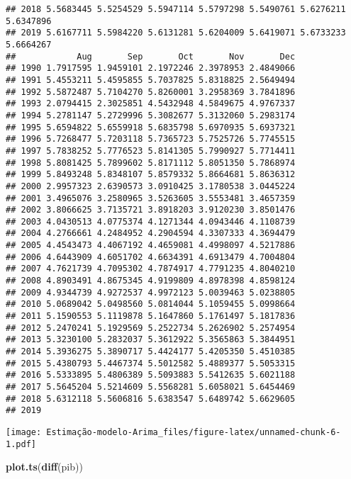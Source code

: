 \documentclass[]{article}
\newenvironment{Shaded}{\begin{snugshade}}{\end{snugshade}}
\newcommand{\CommentTok}[1]{\textcolor[rgb]{0.56,0.35,0.01}{\textit{#1}}}
\newcommand{\KeywordTok}[1]{\textcolor[rgb]{0.13,0.29,0.53}{\textbf{#1}}}
\newcommand{\NormalTok}[1]{#1}
\begin{document}
\begin{verbatim}
## 2018 5.5683445 5.5254529 5.5947114 5.5797298 5.5490761 5.6276211 5.6347896
## 2019 5.6167711 5.5984220 5.6131281 5.6204009 5.6419071 5.6733233 5.6664267
##            Aug       Sep       Oct       Nov       Dec
## 1990 1.7917595 1.9459101 2.1972246 2.3978953 2.4849066
## 1991 5.4553211 5.4595855 5.7037825 5.8318825 2.5649494
## 1992 5.5872487 5.7104270 5.8260001 3.2958369 3.7841896
## 1993 2.0794415 2.3025851 4.5432948 4.5849675 4.9767337
## 1994 5.2781147 5.2729996 5.3082677 5.3132060 5.2983174
## 1995 5.6594822 5.6559918 5.6835798 5.6970935 5.6937321
## 1996 5.7268477 5.7203118 5.7365723 5.7525726 5.7745515
## 1997 5.7838252 5.7776523 5.8141305 5.7990927 5.7714411
## 1998 5.8081425 5.7899602 5.8171112 5.8051350 5.7868974
## 1999 5.8493248 5.8348107 5.8579332 5.8664681 5.8636312
## 2000 2.9957323 2.6390573 3.0910425 3.1780538 3.0445224
## 2001 3.4965076 3.2580965 3.5263605 3.5553481 3.4657359
## 2002 3.8066625 3.7135721 3.8918203 3.9120230 3.8501476
## 2003 4.0430513 4.0775374 4.1271344 4.0943446 4.1108739
## 2004 4.2766661 4.2484952 4.2904594 4.3307333 4.3694479
## 2005 4.4543473 4.4067192 4.4659081 4.4998097 4.5217886
## 2006 4.6443909 4.6051702 4.6634391 4.6913479 4.7004804
## 2007 4.7621739 4.7095302 4.7874917 4.7791235 4.8040210
## 2008 4.8903491 4.8675345 4.9199809 4.8978398 4.8598124
## 2009 4.9344739 4.9272537 4.9972123 5.0039463 5.0238805
## 2010 5.0689042 5.0498560 5.0814044 5.1059455 5.0998664
## 2011 5.1590553 5.1119878 5.1647860 5.1761497 5.1817836
## 2012 5.2470241 5.1929569 5.2522734 5.2626902 5.2574954
## 2013 5.3230100 5.2832037 5.3612922 5.3565863 5.3844951
## 2014 5.3936275 5.3890717 5.4424177 5.4205350 5.4510385
## 2015 5.4380793 5.4467374 5.5012582 5.4889377 5.5053315
## 2016 5.5333895 5.4806389 5.5093883 5.5412635 5.6021188
## 2017 5.5645204 5.5214609 5.5568281 5.6058021 5.6454469
## 2018 5.6312118 5.5606816 5.6383547 5.6489742 5.6629605
## 2019
\end{verbatim}

\begin{Shaded}
\end{Shaded}

\texttt{[image: Estimação-modelo-Arima\_files/figure-latex/unnamed-chunk-6-1.pdf]}

\begin{Shaded}
\begin{Highlighting}[]
\KeywordTok{plot.ts}\NormalTok{(}\KeywordTok{diff}\NormalTok{(pib))}
\end{Highlighting}
\end{Shaded}
\end{document}
